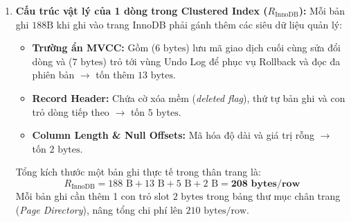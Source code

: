 \begin{enumerate}
  \item \textbf{Cấu trúc vật lý của 1 dòng trong Clustered Index ($R_{\text{InnoDB}}$):}
  Mỗi bản ghi $188\text{B}$ khi ghi vào trang InnoDB phải gánh thêm các siêu dữ liệu quản lý:
  \begin{itemize}
    \item \textbf{Trường ẩn MVCC:} Gồm  ($6\text{ bytes}$) lưu mã giao dịch cuối cùng sửa đổi dòng và  ($7\text{ bytes}$) trỏ tới vùng Undo Log để phục vụ Rollback và đọc đa phiên bản $\rightarrow$ tốn thêm $13\text{ bytes}$.
    \item \textbf{Record Header:} Chứa cờ xóa mềm (\textit{deleted flag}), thứ tự bản ghi và con trỏ dòng tiếp theo $\rightarrow$ tốn $5\text{ bytes}$.
    \item \textbf{Column Length \& Null Offsets:} Mã hóa độ dài và giá trị rỗng $\rightarrow$ tốn $2\text{ bytes}$.
  \end{itemize}
  Tổng kích thước một bản ghi thực tế trong thân trang là:
  \begin{equation}
    R_{\text{InnoDB}} = 188\text{ B} + 13\text{ B} + 5\text{ B} + 2\text{ B} = \mathbf{208\text{ bytes/row}}
  \end{equation}
  Mỗi bản ghi cần thêm 1 con trỏ slot $2\text{ bytes}$ trong bảng thư mục chân trang (\textit{Page Directory}), nâng tổng chi phí lên $210\text{ bytes/row}$.


\end{enumerate}
